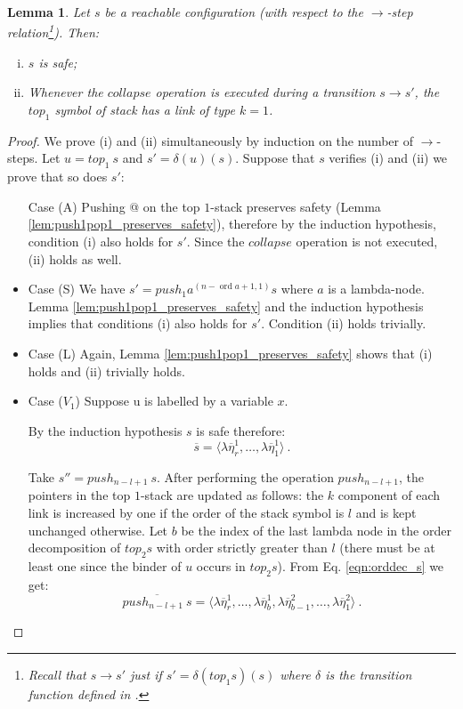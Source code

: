 \documentclass{article}
\newcommand{\ord}{\mathop{\mathrm{ord}}}
\newtheorem{lemma}{Lemma}[section]
\theoremstyle{remark}
\theoremstyle{definition}
\newcommand\orddec\overline
\begin{document}
\begin{lemma}
Let $s$ be a reachable configuration (with respect to the
$\rightarrow$-step relation\footnote{Recall that $s\rightarrow s'$
just if $s' = \delta(top_1 s)(s)$ where $\delta$ is the transition
function defined in \cite[Figure 2]{hague-sto07}.}). Then:
\begin{enumerate}[i.]
\item $s$ is safe;
\item Whenever the $collapse$ operation is executed during a
transition $s \rightarrow s'$, the $top_1$ symbol of stack has a
link of type $k=1$.
\end{enumerate}
\end{lemma}
\begin{proof}
We prove (i) and (ii) simultaneously by induction on the number of
$\rightarrow$-steps. Let $u = top_1\ s$ and $s' =\delta(u)(s)$.
Suppose that $s$ verifies (i) and (ii) we prove that so does $s'$:
\begin{itemize}
\item[Case (A)] Pushing @ on the top $1$-stack preserves safety (Lemma
\ref{lem:push1pop1_preserves_safety}), therefore by the
induction hypothesis, condition (i) also holds for $s'$. Since
the $collapse$ operation is not executed, (ii) holds as well.

\item Case (S)
We have $s' = push_1 a^{(n-\ord{a}+1,1)} s$ where $a$ is a
lambda-node. Lemma \ref{lem:push1pop1_preserves_safety} and the
induction hypothesis implies that conditions (i) also holds for
$s'$. Condition (ii) holds trivially.

\item Case (L) Again, Lemma \ref{lem:push1pop1_preserves_safety}
shows that (i) holds and (ii) trivially holds.

\item Case ($V_1$) Suppose u is labelled by a variable $x$.

By the induction hypothesis $s$ is safe therefore:
\begin{equation}
 \orddec{s} = \langle \lambda \overline{\eta}_r^1
, \ldots, \lambda \overline{\eta}_1^1   \rangle \ . \label{eqn:orddec_s}
\end{equation}

Take $s'' = push_{n-l+1}\ s$. After performing the operation
$push_{n-l+1}$, the pointers in the top $1$-stack are updated as
follows: the $k$ component of each link is increased by one if
the order of the stack symbol is $l$ and is kept unchanged
otherwise. Let $b$ be the index of the last lambda node in the
order decomposition of $top_2 s$ with order strictly greater
than $l$ (there must be at least one since the binder of $u$
occurs in $top_2 s$). From Eq. \ref{eqn:orddec_s} we get:
\begin{equation}
\orddec{push_{n-l+1}\ s} = \langle
\lambda \overline{\eta}_r^1
, \ldots,  \lambda \overline{\eta}_{b}^1, \lambda \overline{\eta}_{b-1}^2, \ldots,
 \lambda \overline{\eta}_1^2 \rangle
\ . \label{eqn:orddec_pushj_s}
\end{equation}



\end{itemize}
\end{proof}
\end{document}
